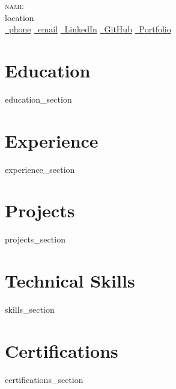 \documentclass[letterpaper,11pt]{article}
\newcommand{\resumeSubHeadingListStart}{\begin{itemize}[label={}]}
\newcommand{\resumeSubHeadingListEnd}{\end{itemize}}
\begin{document}
\begin{center}
  {\Huge \scshape {{{name}}}} \\[2pt]
  {{{location}}} \\[6pt]

  \small
  \href{tel:{{{phone}}}}{\faPhone\ {{{phone}}}}
  \quad
  \href{mailto:{{{email}}}}{\faEnvelope\ {{{email}}}}
  \quad
  \href{ {{{linkedin}}} }{\faLinkedin\ LinkedIn}
  \quad
  \href{ {{{github}}} }{\faGithub\ GitHub}
  \quad
  \href{ {{{portfolio}}} }{\faGlobe\ Portfolio}
\end{center}

\section{Education}
\resumeSubHeadingListStart
{{{education_section}}}
\resumeSubHeadingListEnd

\section{Experience}
\resumeSubHeadingListStart
{{{experience_section}}}
\resumeSubHeadingListEnd

\section{Projects}
\resumeSubHeadingListStart
{{{projects_section}}}
\resumeSubHeadingListEnd

\section{Technical Skills}
\resumeSubHeadingListStart
{{{skills_section}}}
\resumeSubHeadingListEnd

\section{Certifications}
\resumeSubHeadingListStart
{{{certifications_section}}}
\resumeSubHeadingListEnd
\end{document}
